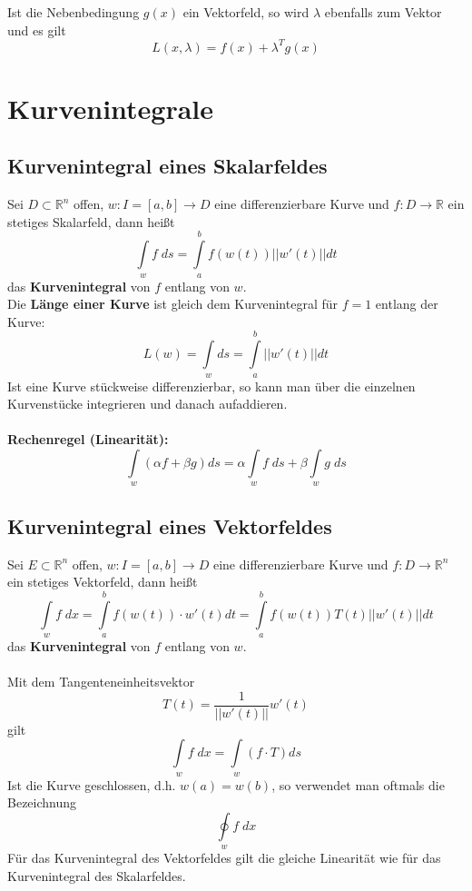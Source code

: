 \documentclass[a4paper,twocolumn,10pt]{article}
\begin{document}
Ist die Nebenbedingung $g(x)$ ein Vektorfeld, so wird $\lambda$ ebenfalls zum Vektor und es gilt
\begin{equation*}
L(x,\lambda)=f(x)+\lambda^T g(x)
\end{equation*}

\section{Kurvenintegrale}

\subsection{Kurvenintegral eines Skalarfeldes}
Sei $D\subset\mathbb{R}^n$ offen, $w:I=[a,b]\rightarrow D$ eine differenzierbare Kurve und $f:D\rightarrow\mathbb{R}$ ein stetiges Skalarfeld, dann heißt
\begin{equation*}
\int\limits_{w} f\;ds=\int\limits_{a}^{b}f(w(t))||w'(t)||dt
\end{equation*}
das \textbf{Kurvenintegral} von $f$ entlang von $w$.\\
Die \textbf{Länge einer Kurve} ist gleich dem Kurvenintegral für $f=1$ entlang der Kurve:
\begin{equation*}
L(w)=\int\limits_{w}ds=\int\limits_{a}^{b}||w'(t)||dt
\end{equation*}
Ist eine Kurve stückweise differenzierbar, so kann man über die einzelnen Kurvenstücke integrieren und danach aufaddieren.\\\\
\textbf{Rechenregel (Linearität):}\\
\begin{equation*}
\int\limits_{w}(\alpha f+\beta g)ds=\alpha\int\limits_{w}f\;ds+\beta\int\limits_{w} g\;ds
\end{equation*}

\subsection{Kurvenintegral eines Vektorfeldes}
Sei $E\subset\mathbb{R}^n$ offen, $w:I=[a,b]\rightarrow D$ eine differenzierbare Kurve und $f:D\rightarrow\mathbb{R}^n$ ein stetiges Vektorfeld, dann heißt
\begin{equation*}
\int\limits_{w}f\;dx=\int\limits_{a}^{b}f(w(t))\cdot w'(t)dt=\int\limits_{a}^{b}f(w(t))T(t)||w'(t)||dt
\end{equation*}
das \textbf{Kurvenintegral} von $f$ entlang von $w$.\\\\
Mit dem Tangenteneinheitsvektor
\begin{equation*}
T(t)=\frac{1}{||w'(t)||}w'(t)
\end{equation*}
gilt
\begin{equation*}
\int\limits_{w}f\;dx=\int\limits_{w}(f\cdot T)ds
\end{equation*}
Ist die Kurve geschlossen, d.h. $w(a)=w(b)$, so verwendet man oftmals die Bezeichnung
\begin{equation*}
\oint\limits_{w}f\;dx
\end{equation*}
Für das Kurvenintegral des Vektorfeldes gilt die gleiche Linearität wie für das Kurvenintegral des Skalarfeldes.
\end{document}
